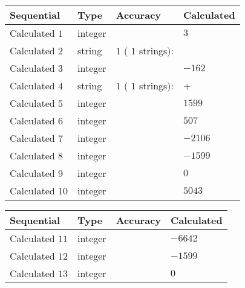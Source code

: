 \documentclass[12pt]{article}
\begin{document}
  
\noindent\begin{tabular}{|l|l|l|l|}
\hline
 Sequential & Type & Accuracy & Calculated \\ 
\hline
 
 
  Calculated $            1 $ & integer &  & 
  $ 3 $ 
 \\  \hline  
 
 
  Calculated $            2 $ & string & $            1  $ ( $           1  $ strings): 
 & 
 \\  \hline  
 
 
  Calculated $            3 $ & integer &  & 
  $ -162 $ 
 \\  \hline  
 
 
  Calculated $            4 $ & string & $            1  $ ( $           1  $ strings): 
 & +
 \\  \hline  
 
 
  Calculated $            5 $ & integer &  & 
  $ 1599 $ 
 \\  \hline  
 
 
  Calculated $            6 $ & integer &  & 
  $ 507 $ 
 \\  \hline  
 
 
  Calculated $            7 $ & integer &  & 
  $ -2106 $ 
 \\  \hline  
 
 
  Calculated $            8 $ & integer &  & 
  $ -1599 $ 
 \\  \hline  
 
 
  Calculated $            9 $ & integer &  & 
  $ 0 $ 
 \\  \hline  
 
 
  Calculated $           10 $ & integer &  & 
  $ 5043 $ 
 \\  \hline  
 \end{tabular}
   
   
  
  
\noindent\begin{tabular}{|l|l|l|l|}
\hline
 Sequential & Type & Accuracy & Calculated \\ 
\hline
 
 
  Calculated $           11 $ & integer &  & 
  $ -6642 $ 
 \\  \hline  
 
 
  Calculated $           12 $ & integer &  & 
  $ -1599 $ 
 \\  \hline  
 
 
  Calculated $           13 $ & integer &  & 
  $ 0 $ 
 \\  \hline  
 \end{tabular}
   
\end{document}
